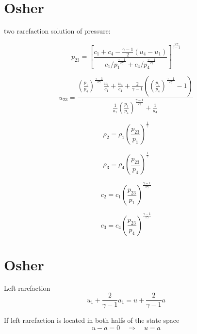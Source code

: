 \documentclass{article}
\begin{document}
\section{Osher}

two rarefaction solution of pressure:

\begin{equation}
p_{23}=\left[\frac{c_1+c_4-\frac{\gamma-1}{2}(u_4-u_1)}{c_1/p_1^\frac{\gamma-1}{2\gamma}+c_4/p_4^\frac{\gamma-1}{2\gamma}}\right]^\frac{2\gamma}{\gamma-1}
\end{equation}

\begin{equation}
u_{23}=\frac{\left(\frac{p_1}{p_4}\right)^\frac{\gamma-1}{2\gamma}\frac{u_1}{c_1}+\frac{u_4}{c_4}+\frac{2}{\gamma-1}\left(\left(\frac{p_1}{p_4}\right)^\frac{\gamma-1}{2\gamma}-1\right)}{\frac{1}{a_1}\left(\frac{p_1}{p_4}\right)^\frac{\gamma-1}{2\gamma}+\frac{1}{a_4}}
\end{equation}

\begin{equation}
\rho_2=\rho_1\left(\frac{p_{23}}{p_1}\right)^\frac{1}{\gamma}
\end{equation}

\begin{equation}
\rho_3=\rho_4\left(\frac{p_{23}}{p_4}\right)^\frac{1}{\gamma}
\end{equation}

\begin{equation}
c_2=c_1\left(\frac{p_{23}}{p_1}\right)^\frac{\gamma-1}{2\gamma}
\end{equation}

\begin{equation}
c_3=c_4\left(\frac{p_{23}}{p_4}\right)^\frac{\gamma-1}{2\gamma}
\end{equation}

% 
% 
% 


\section{Osher}
Left rarefaction
\begin{equation}
u_1+\frac{2}{\gamma-1}a_1=u+\frac{2}{\gamma-1}a
\end{equation}

If left rarefaction is located in both halfs of the state space
\begin{equation}
u-a=0 \quad \Rightarrow \quad u=a
\end{equation}
\end{document}
